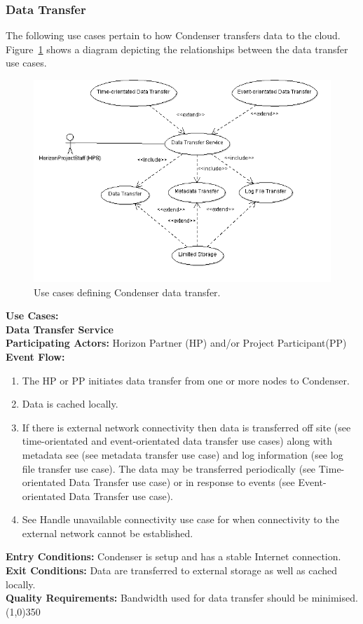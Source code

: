\subsubsection{Data Transfer}		
The following use cases pertain to how Condenser transfers data to the cloud. Figure~\ref{DataTransferUse} shows a diagram depicting the relationships between the data transfer use cases.
\begin{center}
	\begin{figure}[htbp]
		\includegraphics[scale=.5]{images/DataTransferUse.png}
		\caption{Use cases defining Condenser data transfer.\label{DataTransferUse}}
	\end{figure}
\end{center}	
\textbf{Use Cases:}\\
 
		\textbf{Data Transfer Service}\\	 
		\textbf{Participating Actors:} Horizon Partner (HP) and/or Project Participant(PP) \\
		\textbf{Event Flow:}
		\begin{enumerate}
\item The HP or PP initiates data transfer from one or more nodes to Condenser.
\item Data is cached locally.
\item If there is external network connectivity then data is transferred off site (see time-orientated and event-orientated data transfer use cases) along with metadata see (see metadata transfer use case) and log information (see log file transfer use case). The data may be transferred periodically (see Time-orientated Data Transfer use case) or in response to events (see Event-orientated Data Transfer use case). 
\item See Handle unavailable connectivity use case for when connectivity to the external network cannot be established.
	    \end{enumerate}
		\textbf{Entry Conditions:} Condenser is setup and has a stable Internet connection.\\
		\textbf{Exit Conditions:} Data are transferred to external storage as well as cached locally.\\
		\textbf{Quality Requirements:} Bandwidth used for data transfer should be minimised.\\
		\line(1,0){350}	
 

